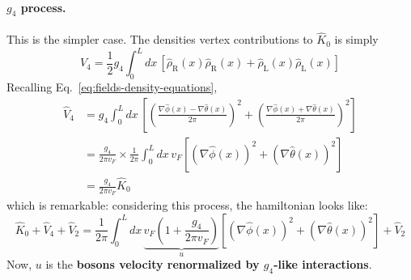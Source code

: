 \paragraph{$g_4$ process.} This is the simpler case. The densities vertex contributions to $\hat K_0$ is simply
\[
	\hat V_4 = \frac{1}{2} g_4 \int_0^L dx \, \left[ \hat \rho_\mathrm{R} (x) \hat \rho_\mathrm{R} (x) + \hat \rho_\mathrm{L} (x) \hat \rho_\mathrm{L} (x) \right]
\]
Recalling Eq.~\eqref{eq:fields-density-equations},
\[
\begin{aligned}
	\hat V_4 &= g_4 \int_0^L dx \, \left[ \left( \frac{\nabla \hat \phi(x) - \nabla \hat \theta(x)}{2\pi} \right)^2 + \left( \frac{\nabla \hat \phi(x) + \nabla \hat \theta(x)}{2\pi} \right)^2 \right] \\
	&= \frac{g_4}{2\pi v_F} \times \frac{1}{2\pi} \int_0^L dx \, v_F \left[ \left( \nabla \hat \phi(x) \right)^2 + \left( \nabla \hat \theta(x) \right)^2 \right] \\
	&= \frac{g_4}{2\pi v_F} \hat K_0
\end{aligned}
\]
which is remarkable: considering this process, the hamiltonian looks like:
\[
	\hat K_0 + \hat V_4 + \hat V_2 = \frac{1}{2\pi} \int_0^L dx \, \underbrace{v_F \left( 1 + \frac{g_4}{2\pi v_F} \right)}_{u} \left[ \left( \nabla \hat \phi(x) \right)^2 + \left( \nabla \hat \theta(x) \right)^2 \right] + \hat V_2
\]
Now, $u$ is the \textbf{bosons velocity renormalized by $g_4$-like interactions}.

